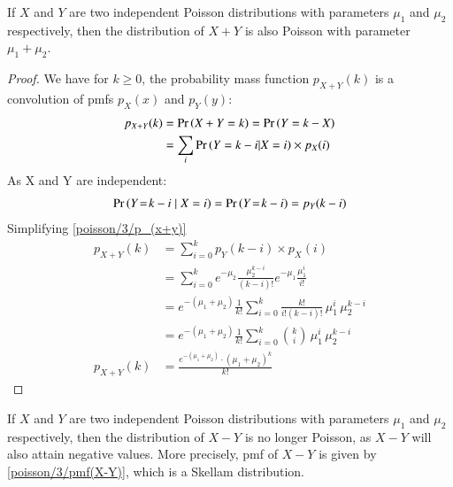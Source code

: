         \begin{lemma}\label{poisson/3/lemma_X+Y}
            If $X$ and $Y$ are two independent Poisson distributions with parameters $\mu_1$ and $\mu_2$ respectively, then the distribution of $X+Y$ is also Poisson with parameter $\mu_1 + \mu_2$. 
        \end{lemma}
        \begin{proof}
             We have for $k \geq 0$, the probability mass function $p_{X+Y}(k)$ is a convolution of pmfs $p_X(x)$ and $p_Y(y)$: 
        \begin{align}
           p_{X+Y}(k) &= \Pr\left(X+ Y = k\right) = \Pr\left(Y = k - X\right)\\
           &= \sum_{i}\Pr\left(Y = k - i| X=i\right)\times p_X(i)\label{poisson/3/p_(x+y)}
        \end{align}
        As X and Y are independent: 
        \begin{align}
            \Pr\left(Y\! =\! k - i \mid X=i\right) = \Pr\left(Y\! = \! k - i\right) = p_Y(k-i)
        \end{align}
        Simplifying \eqref{poisson/3/p_(x+y)}
        \begin{align}
            p_{X+Y}(k) &= \sum_{i=0}^k p_Y(k-i) \times p_X(i)\\
            &= \sum_{i=0}^k e^{-\mu_2}\frac{\mu_2^{k-i}}{(k-i)!}e^{-\mu_1}\frac{\mu_1^i}{i!}\\
            &= e^{-(\mu_1 + \mu_2)}\frac 1{k!}\sum_{i=0}^k \frac{k!}{i!(k-i)!}\,\mu_1^i\,\mu_2^{k-i}\\
            &= e^{-(\mu_1 + \mu_2)}\frac 1{k!}\sum_{i=0}^k {k\choose i}\, \mu_1^i\,\mu_2^{k-i}\\
            p_{X+Y}(k) &= \frac{e^{-(\mu_1 + \mu_2)} \cdot (\mu_1 + \mu_2)^k}{k!}
        \end{align}
        \end{proof}
        \begin{lemma}\label{poisson/3/lemma_X-Y}
            If $X$ and $Y$ are two independent Poisson distributions with parameters $\mu_1$ and $\mu_2$ respectively, then the distribution of $X-Y$ is no longer Poisson, as $X - Y$ will also attain negative values.  More precisely, pmf of $X-Y$ is given by \eqref{poisson/3/pmf(X-Y)}, which is a Skellam distribution.
        \end{lemma}
